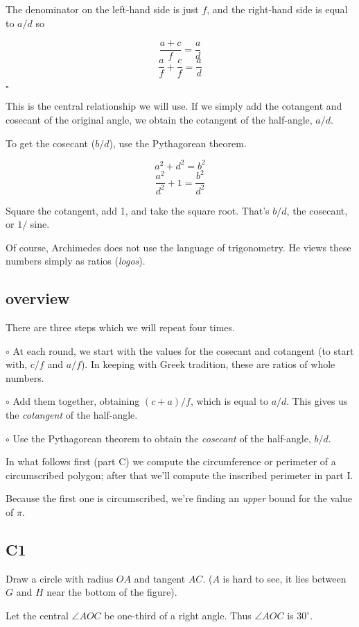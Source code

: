 \documentclass[11pt, oneside]{article}
\begin{document}
The denominator on the left-hand side is just $f$, and the right-hand side is equal to $a/d$ so

\[ \frac{a + c}{f} = \frac{a}{d} \]
\[ \frac{a}{f} + \frac{c}{f} = \frac{a}{d} \]

$\square$

This is the central relationship we will use.  If we simply add the cotangent and cosecant of the original angle, we obtain the cotangent of the half-angle, $a/d$.  

To get the cosecant ($b/d$), use the Pythagorean theorem.

\[ a^2 + d^2 = b^2 \]
\[ \frac{a^2}{d^2} + 1 = \frac{b^2}{d^2} \]

Square the cotangent, add 1, and take the square root.  That's $b/d$, the cosecant, or $1/$ sine.

Of course, Archimedes does not use the language of trigonometry.  He views these numbers simply as ratios (\emph{logos}).  

\subsection*{overview}
There are three steps which we will repeat four times.  
 
$\circ$ At each round, we start with the values for the cosecant and cotangent (to start with, $c/f$ and $a/f$).  In keeping with Greek tradition, these are ratios of whole numbers.
  
$\circ$ Add them together, obtaining $(c + a)/f$, which is equal to $a/d$.  This gives us the \emph{cotangent} of the half-angle.
 
$\circ$ Use the Pythagorean theorem to obtain the \emph{cosecant} of the half-angle, $b/d$.

In what follows first (part C) we compute the circumference or perimeter of a circumscribed polygon;  after that we'll compute the inscribed perimeter in part I.  

Because the first one is circumscribed, we're finding an \emph{upper} bound for the value of $\pi$.
 
\subsection*{C1}
Draw a circle with radius $OA$ and tangent $AC$.  ($A$ is hard to see, it lies between $G$ and $H$ near the bottom of the figure).

Let the central $\angle AOC$ be one-third of a right angle.  Thus $\angle AOC$ is $30^{\circ}$.
\end{document}
